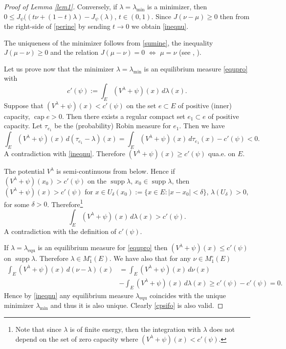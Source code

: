\documentclass[11pt, a4paper, twoside]{article}
\let\leq\leqslant
\let\geq\geqslant
\def\supp{\operatorname{supp}}
\def\mcap{\operatorname{cap}}
\def\equ{\operatorname{equ}}
\theoremstyle{plain}
\theoremstyle{definition}
\begin{document}
\begin{proof}[Proof of Lemma \ref{lem1}]
Conversely, if $\lambda=\lambda_{\min}$ is a minimizer, then $0\leq J_\psi((t\nu+(1-t)\lambda)-J_\psi(\lambda)$, $t\in(0,1)$. Since $J(\nu-\mu)\geq0$ then from the right-side of \eqref{perine}  by sending $t\to0$ we  obtain \eqref{ineqnu}.

The uniqueness of the minimizer follows from \eqref{sumine}, the inequality $J(\mu-\nu)\geq0$ and the relation $J(\mu-\nu)=0$ $\Leftrightarrow$ $\mu=\nu$ (see \cite{Chi18}, \cite{Chi19}).

Let us prove now that the minimizer $\lambda=\lambda_{\min}$ is an equilibrium measure \eqref{equpro} with
$$
c'(\psi):=\int_E (V^\lambda+\psi)(x)\,d\lambda(x).
$$
Suppose that $(V^\lambda+\psi)(x)<c'(\psi)$ on the set  $e\subset E$ of positive (inner) capacity, $\mcap{e}>0$. Then there exists \cite{Anc83} a regular compact set $e_1\subset e$ of positive capacity.  Let $\tau_{e_1}$ be the (probability) Robin measure for $e_1$. Then we have
$$
\int_E(V^\lambda+\psi)(x)\,d(\tau_{e_1}-\lambda)(x)
=\int_E(V^\lambda+\psi)(x)\,d\tau_{e_1}(x) -c'(\psi)<0.
$$
A contradiction with \eqref{ineqnu}. 
Therefore  $(V^\lambda+\psi)(x)\geq c'(\psi)$ qua.e. on $E$. 

The potential $V^\lambda$ is semi-continuous from below. Hence if $(V^\lambda+\psi)(x_0)>c'(\psi)$ on the $\supp{\lambda}$, $x_0\in\supp{\lambda}$,  then $(V^\lambda+\psi)(x)>c'(\psi)$ for $x\in U_\delta(x_0):=\{x\in E:|x-x_0|<\delta\}$, $\lambda(U_\delta)>0$, for some $\delta>0$. Therefore\footnote{Note that since $\lambda$ is of finite energy, then the integration with $\lambda$ does not depend on the set of zero capacity where $(V^\lambda+\psi)(x)<c'(\psi)$.}
$$
\int_E(V^\lambda+\psi)(x)\,d\lambda(x)>c'(\psi).
$$
A contradiction with the definition of $c'(\psi)$.

If $\lambda=\lambda_{\equ}$ is an equilibrium measure for \eqref{equpro} then $(V^\lambda+\psi)(x)\leq c'(\psi)$ on $\supp{\lambda}$. Therefore $\lambda\in M_1^\circ(E)$. We have also that for any $\nu\in M_1^\circ(E)$
\begin{align*}
\int_E(V^\lambda+\psi)(x)\,d(\nu-\lambda)(x)&=\int_E(V^\lambda+\psi)(x)\,d\nu(x)\\
&-\int_E(V^\lambda+\psi)(x)\,d\lambda(x)\geq c'(\psi)-c'(\psi)=0.
\end{align*}
Hence by \eqref{ineqnu} any equilibrium measure $\lambda_{\equ}$ coincides with the unique minimizer $\lambda_{\min}$ and  thus it is also unique. Clearly \eqref{cpsifo} is also valid.
\end{proof}
\end{document}
